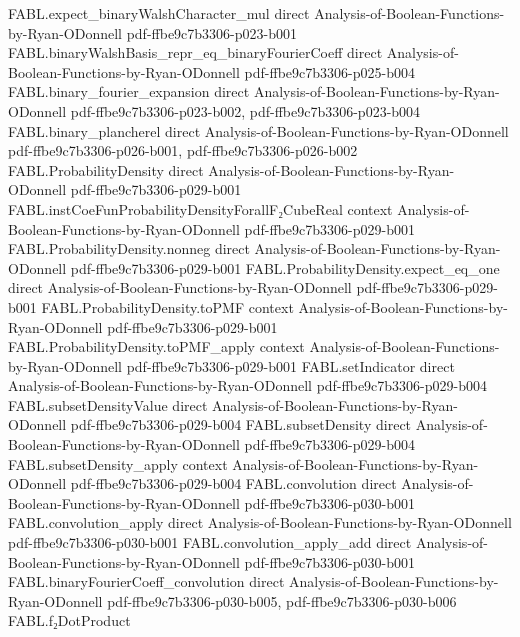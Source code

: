 \begin{theorem}
\proofstep
  {FABL.expect_binaryWalshCharacter_mul}
  {direct}
  {Analysis-of-Boolean-Functions-by-Ryan-ODonnell}
  {pdf-ffbe9c7b3306-p023-b001}
\proofstep
  {FABL.binaryWalshBasis_repr_eq_binaryFourierCoeff}
  {direct}
  {Analysis-of-Boolean-Functions-by-Ryan-ODonnell}
  {pdf-ffbe9c7b3306-p025-b004}
\proofstep
  {FABL.binary_fourier_expansion}
  {direct}
  {Analysis-of-Boolean-Functions-by-Ryan-ODonnell}
  {pdf-ffbe9c7b3306-p023-b002,
    pdf-ffbe9c7b3306-p023-b004}
\proofstep
  {FABL.binary_plancherel}
  {direct}
  {Analysis-of-Boolean-Functions-by-Ryan-ODonnell}
  {pdf-ffbe9c7b3306-p026-b001,
    pdf-ffbe9c7b3306-p026-b002}
\proofstep
  {FABL.ProbabilityDensity}
  {direct}
  {Analysis-of-Boolean-Functions-by-Ryan-ODonnell}
  {pdf-ffbe9c7b3306-p029-b001}
\proofstep
  {FABL.instCoeFunProbabilityDensityForallF₂CubeReal}
  {context}
  {Analysis-of-Boolean-Functions-by-Ryan-ODonnell}
  {pdf-ffbe9c7b3306-p029-b001}
\proofstep
  {FABL.ProbabilityDensity.nonneg}
  {direct}
  {Analysis-of-Boolean-Functions-by-Ryan-ODonnell}
  {pdf-ffbe9c7b3306-p029-b001}
\proofstep
  {FABL.ProbabilityDensity.expect_eq_one}
  {direct}
  {Analysis-of-Boolean-Functions-by-Ryan-ODonnell}
  {pdf-ffbe9c7b3306-p029-b001}
\proofstep
  {FABL.ProbabilityDensity.toPMF}
  {context}
  {Analysis-of-Boolean-Functions-by-Ryan-ODonnell}
  {pdf-ffbe9c7b3306-p029-b001}
\proofstep
  {FABL.ProbabilityDensity.toPMF_apply}
  {context}
  {Analysis-of-Boolean-Functions-by-Ryan-ODonnell}
  {pdf-ffbe9c7b3306-p029-b001}
\proofstep
  {FABL.setIndicator}
  {direct}
  {Analysis-of-Boolean-Functions-by-Ryan-ODonnell}
  {pdf-ffbe9c7b3306-p029-b004}
\proofstep
  {FABL.subsetDensityValue}
  {direct}
  {Analysis-of-Boolean-Functions-by-Ryan-ODonnell}
  {pdf-ffbe9c7b3306-p029-b004}
\proofstep
  {FABL.subsetDensity}
  {direct}
  {Analysis-of-Boolean-Functions-by-Ryan-ODonnell}
  {pdf-ffbe9c7b3306-p029-b004}
\proofstep
  {FABL.subsetDensity_apply}
  {context}
  {Analysis-of-Boolean-Functions-by-Ryan-ODonnell}
  {pdf-ffbe9c7b3306-p029-b004}
\proofstep
  {FABL.convolution}
  {direct}
  {Analysis-of-Boolean-Functions-by-Ryan-ODonnell}
  {pdf-ffbe9c7b3306-p030-b001}
\proofstep
  {FABL.convolution_apply}
  {direct}
  {Analysis-of-Boolean-Functions-by-Ryan-ODonnell}
  {pdf-ffbe9c7b3306-p030-b001}
\proofstep
  {FABL.convolution_apply_add}
  {direct}
  {Analysis-of-Boolean-Functions-by-Ryan-ODonnell}
  {pdf-ffbe9c7b3306-p030-b001}
\proofstep
  {FABL.binaryFourierCoeff_convolution}
  {direct}
  {Analysis-of-Boolean-Functions-by-Ryan-ODonnell}
  {pdf-ffbe9c7b3306-p030-b005,
    pdf-ffbe9c7b3306-p030-b006}
\proofstep
  {FABL.f₂DotProduct}

\end{theorem}

